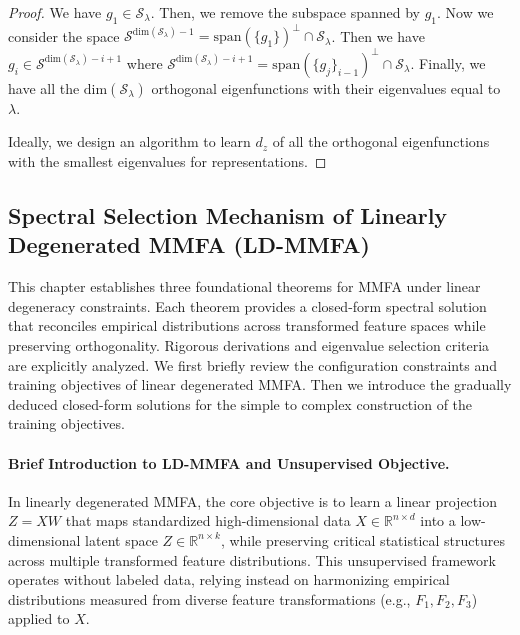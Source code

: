 \begin{proof}
We have $g_1 \in \mathcal{S}_\lambda$. Then, we remove the subspace spanned by $g_1$. Now we consider the space $\mathcal{S}^{\text{dim}(\mathcal{S}_{\lambda}) - 1} = \text{span}(\{g_1\})^\perp \cap \mathcal{S}_{\lambda}$. Then we have $g_i \in \mathcal{S}^{\text{dim}(\mathcal{S}_{\lambda}) - i + 1}$ where $\mathcal{S}^{\text{dim}(\mathcal{S}_{\lambda}) - i + 1}= \text{span}(\{g_j\}_{i-1})^\perp\cap \mathcal{S}_{\lambda}$. Finally, we have all the $\text{dim}(\mathcal{S}_{\lambda})$ orthogonal eigenfunctions with their eigenvalues equal to $\lambda$.

Ideally, we design an algorithm to learn $d_z$ of all the orthogonal eigenfunctions with the smallest eigenvalues for representations.

\end{proof}

\subsection{Spectral Selection Mechanism of Linearly Degenerated MMFA (LD-MMFA)}



This chapter establishes three foundational theorems for MMFA under linear degeneracy constraints. Each theorem provides a closed-form spectral solution that reconciles empirical distributions across transformed feature spaces while preserving orthogonality. Rigorous derivations and eigenvalue selection criteria are explicitly analyzed. We first briefly review the configuration constraints and training objectives of linear degenerated MMFA. Then we introduce the gradually deduced closed-form solutions for the simple to complex construction of the training objectives. 

\paragraph{Brief Introduction to LD-MMFA and Unsupervised Objective.}\label{sec:recover}

In linearly degenerated MMFA, the core objective is to learn a linear projection \( Z = XW \) that maps standardized high-dimensional data \( X \in \mathbb{R}^{n \times d} \) into a low-dimensional latent space \( Z \in \mathbb{R}^{n \times k} \), while preserving critical statistical structures across multiple transformed feature distributions. This unsupervised framework operates without labeled data, relying instead on harmonizing empirical distributions measured from diverse feature transformations (e.g., \( F_1, F_2, F_3 \)) applied to \( X \). 


